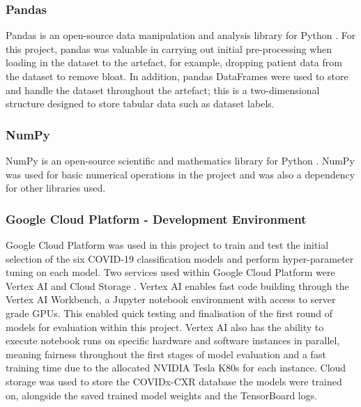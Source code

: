 \subsubsection{Pandas}
Pandas is an open-source data manipulation and analysis library for Python \citep{pandasPy63:online}. For this project, pandas was valuable in carrying out initial pre-processing when loading in the dataset to the artefact, for example, dropping patient data from the dataset to remove bloat. In addition, pandas DataFrames were used to store and handle the dataset throughout the artefact; this is a two-dimensional structure designed to store tabular data such as dataset labels.

\subsubsection{NumPy}
NumPy is an open-source scientific and mathematics library for Python \citep{NumPy90:online}. NumPy was used for basic numerical operations in the project and was also a dependency for other libraries used.

\subsubsection{Google Cloud Platform - Development Environment}
Google Cloud Platform was used in this project to train and test the initial selection of the six COVID-19 classification models and perform hyper-parameter tuning on each model. Two services used within Google Cloud Platform were Vertex AI \citep{VertexAI57:online} and Cloud Storage \citep{CloudSto72:online}. Vertex AI enables fast code building through the Vertex AI Workbench, a Jupyter notebook environment with access to server grade GPUs. This enabled quick testing and finalisation of the first round of models for evaluation within this project. Vertex AI also has the ability to execute notebook runs on specific hardware and software instances in parallel, meaning fairness throughout the first stages of model evaluation and a fast training time due to the allocated NVIDIA Tesla K80s for each instance. Cloud storage was used to store the COVIDx-CXR database the models were trained on, alongside the saved trained model weights and the TensorBoard logs.

